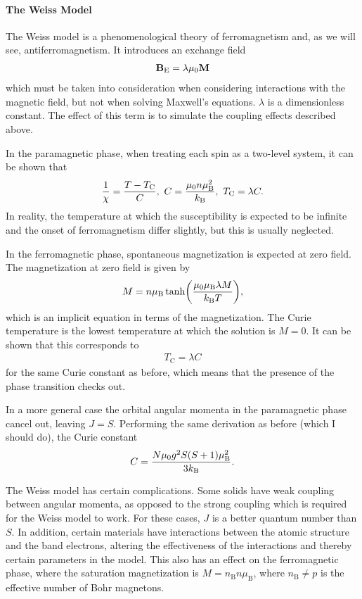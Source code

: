 \paragraph{The Weiss Model}
The Weiss model is a phenomenological theory of ferromagnetism and, as we will see, antiferromagnetism. It introduces an exchange field
\begin{align*}
	\vb{B}_{\text{E}} = \lambda\mu_{0}\vb{M}
\end{align*}
which must be taken into consideration when considering interactions with the magnetic field, but not when solving Maxwell's equations. $\lambda$ is a dimensionless constant. The effect of this term is to simulate the coupling effects described above.

In the paramagnetic phase, when treating each spin as a two-level system, it can be shown that
\begin{align*}
	\frac{1}{\chi} = \frac{T - T_{\text{C}}}{C},\ C = \frac{\mu_{0}n\mu_{\text{B}}^{2}}{k_{\text{B}}},\ T_{\text{C}} = \lambda C.
\end{align*}
In reality, the temperature at which the susceptibility is expected to be infinite and the onset of ferromagnetism differ slightly, but this is usually neglected.

In the ferromagnetic phase, spontaneous magnetization is expected at zero field. The magnetization at zero field is given by
\begin{align*}
	M = n\mu_{\text{B}}\tanh(\frac{\mu_{0}\mu_{\text{B}}\lambda M}{k_{\text{B}} T}),
\end{align*}
which is an implicit equation in terms of the magnetization. The Curie temperature is the lowest temperature at which the solution is $M = 0$. It can be shown that this corresponds to
\begin{align*}
	T_{\text{C}} = \lambda C
\end{align*}
for the same Curie constant as before, which means that the presence of the phase transition checks out.

In a more general case the orbital angular momenta in the paramagnetic phase cancel out, leaving $J = S$. Performing the same derivation as before (which I should do), the Curie constant
\begin{align*}
	C = \frac{N\mu_{0}g^{2}S(S + 1)\mu_{\text{B}}^{2}}{3k_{\text{B}}}.
\end{align*}

The Weiss model has certain complications. Some solids have weak coupling between angular momenta, as opposed to the strong coupling which is required for the Weiss model to work. For these cases, $J$ is a better quantum number than $S$. In addition, certain materials have interactions between the atomic structure and the band electrons, altering the effectiveness of the interactions and thereby certain parameters in the model. This also has an effect on the ferromagnetic phase, where the saturation magnetization is $M = n_{\text{B}}n\mu_{\text{B}}$, where $n_{\text{B}} \neq p$ is the effective number of Bohr magnetons.

